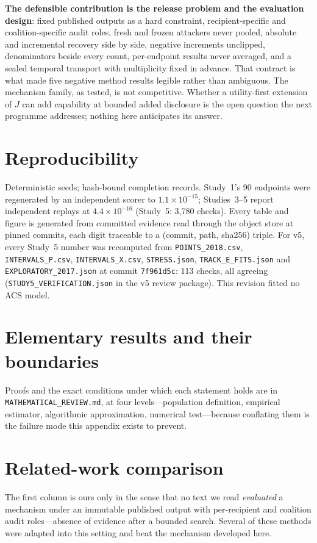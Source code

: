 \documentclass[10pt]{article}
\begin{document}
\textbf{The defensible contribution is the release problem and the evaluation design}: fixed published outputs
as a hard constraint, recipient-specific and coalition-specific audit roles, fresh and frozen attackers never
pooled, absolute and incremental recovery side by side, negative increments unclipped, denominators beside
every count, per-endpoint results never averaged, and a sealed temporal transport with multiplicity fixed in
advance. That contract is what made five negative method results legible rather than ambiguous. The mechanism
family, as tested, is not competitive. Whether a utility-first extension of $J$ can add capability at bounded
added disclosure is the open question the next programme addresses; nothing here anticipates its answer.

\section{Reproducibility}

Deterministic seeds; hash-bound completion records. Study~1's 90 endpoints were regenerated by an independent
scorer to $1.1\times10^{-15}$; Studies~3--5 report independent replays at $4.4\times10^{-16}$ (Study~5: 3{,}780
checks). Every table and figure is generated from committed evidence read through the object store at pinned
commits, each digit traceable to a (commit, path, sha256) triple. For v5, every Study~5 number was recomputed
from \texttt{POINTS\_2018.csv}, \texttt{INTERVALS\_P.csv}, \texttt{INTERVALS\_X.csv}, \texttt{STRESS.json},
\texttt{TRACK\_E\_FITS.json} and \texttt{EXPLORATORY\_2017.json} at commit \texttt{7f961d5c}: 113 checks, all
agreeing (\texttt{STUDY5\_VERIFICATION.json} in the v5 review package). This revision fitted no
ACS model.

\appendix
\clearpage

\section{Elementary results and their boundaries}
\label{app:math}
\noindent Proofs and the exact conditions under which each statement holds are in
\texttt{MATHEMATICAL\_REVIEW.md}, at four levels---population definition, empirical estimator, algorithmic
approximation, numerical test---because conflating them is the failure mode this appendix exists to prevent.

\section{Related-work comparison}
\label{app:related}
\begin{table}[H]
\centering\small

\caption{The five features this paper's setting turns on. \noteRelatedWork}
\label{tab:related}
\end{table}
\noindent The first column is ours only in the sense that no text we read \emph{evaluated} a mechanism under an
immutable published output with per-recipient and coalition audit roles---absence of evidence after a bounded
search. Several of these methods were adapted into this setting and beat the mechanism developed here.
\end{document}
